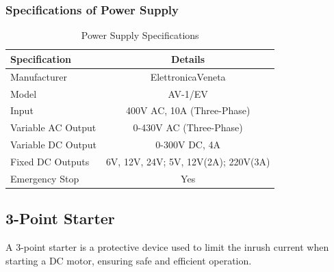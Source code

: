 \documentclass[a4paper,12pt]{article}
\begin{document}
	\subsubsection{Specifications of Power Supply}
	\begin{table}[H]
		\centering
		\caption{Power Supply Specifications}
		\begin{tabular}{|l|c|}
			\hline
			\textbf{Specification} & \textbf{Details} \\ \hline
			Manufacturer & ElettronicaVeneta \\ \hline
			Model & AV-1/EV \\ \hline
			Input & 400V AC, 10A (Three-Phase) \\ \hline
			Variable AC Output & 0-430V AC (Three-Phase) \\ \hline
			Variable DC Output & 0-300V DC, 4A \\ \hline
			Fixed DC Outputs & 6V, 12V, 24V; 5V, 12V(2A); 220V(3A) \\ \hline
			Emergency Stop & Yes \\ \hline
		\end{tabular}
		
		\label{tab:power_supply}
	\end{table}
	\newpage
	\subsection{3-Point Starter}
	A 3-point starter is a protective device used to limit the inrush current when starting a DC motor, ensuring safe and efficient operation.
	
\end{document}
